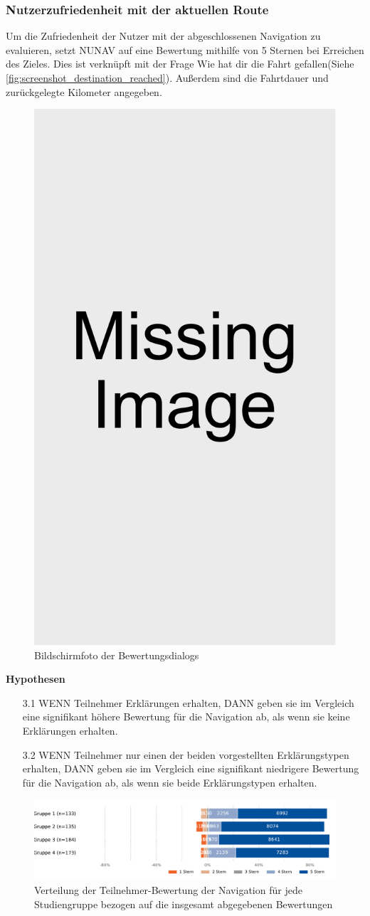 \subsubsection{Nutzerzufriedenheit mit der aktuellen Route}

Um die Zufriedenheit der Nutzer mit der abgeschlossenen Navigation zu evaluieren, setzt NUNAV auf eine Bewertung mithilfe von 5 Sternen bei Erreichen des Zieles. Dies ist verknüpft mit der Frage \glqq Wie hat dir die Fahrt gefallen\grqq (Siehe \autoref{fig:screenshot_destination_reached}). Außerdem sind die Fahrtdauer und zurückgelegte Kilometer angegeben.

\begin{figure}
    \centering
    \includegraphics[width=0.27\linewidth]{contents/res/missing_image.pdf}
    \caption{Bildschirmfoto der Bewertungsdialogs}
    \label{fig:screenshot_destination_reached}
\end{figure}

\textbf{Hypothesen}

\begin{enumerate}
    \item[3.1] WENN Teilnehmer Erklärungen erhalten, DANN geben sie im Vergleich eine signifikant höhere Bewertung für die Navigation ab, als wenn sie keine Erklärungen erhalten.
    \item[3.2] WENN Teilnehmer nur einen der beiden vorgestellten Erklärungstypen erhalten, DANN geben sie im Vergleich eine signifikant niedrigere Bewertung für die Navigation ab, als wenn sie beide Erklärungstypen erhalten.
\end{enumerate}

\begin{figure}
    \centering
    \includegraphics[width=\linewidth]{contents/06_model_evaluation/res/Rating_Result_Overview.pdf}
    \caption{Verteilung der Teilnehmer-Bewertung der Navigation für jede Studiengruppe bezogen auf die insgesamt abgegebenen Bewertungen}
    \label{fig:Rating_Result_Overview}
\end{figure}

